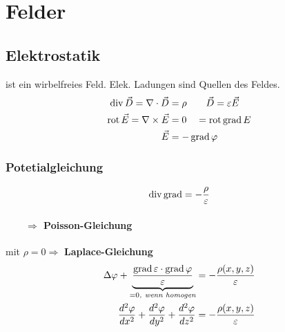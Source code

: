 \section{Felder}

\subsection{Elektrostatik}
ist ein wirbelfreies Feld. Elek. Ladungen sind Quellen des Feldes.
\begin{align*}
    \operatorname{div} \vec{D} = \nabla \cdot \vec{D}  &= \rho       \qquad          \vec{D} = \varepsilon \vec{E}\\
    \operatorname{rot} \vec{E} = \nabla \times \vec{E} &= 0 \quad = \operatorname{rot} \operatorname{grad} E\\
    \vec{E} &=- \operatorname{grad} \varphi
\end{align*}
\subsubsection{Potetialgleichung}
\[
    \operatorname{div} \operatorname{grad} = - \dfrac{\rho}{\varepsilon}
\]
\paragraph{$\qquad \Rightarrow$ Poisson-Gleichung}
mit $\rho = 0 \Rightarrow$ \textbf{Laplace-Gleichung}
\begin{align*}
    \Delta \varphi + \underbrace{ \dfrac{\operatorname{grad} \varepsilon \cdot \operatorname{grad} \varphi}{\varepsilon}}_{= 0\textit{, wenn homogen}}       
                                &= - \dfrac{\rho (x, y, z)}{\varepsilon}\\
    \frac{d^2 \varphi}{d x^2} + \frac{d^2 \varphi}{d y^2} + \frac{d^2 \varphi}{d z^2}
                                &= - \dfrac{\rho (x, y, z)}{\varepsilon}
\end{align*}
